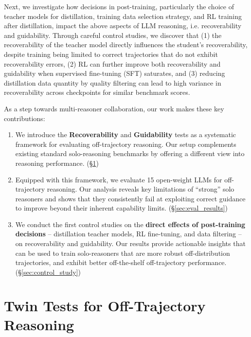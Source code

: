\documentclass{article} %
\begin{document}
Next, we investigate how decisions in post-training, particularly the choice of teacher models for distillation, training data selection strategy, and RL training after distillation, impact the above aspects of LLM reasoning, i.e. recoverability and guidability. Through careful control studies, we discover that (1) the recoverability of the teacher model directly influences the student's recoverability, despite training being limited to correct trajectories that do not exhibit recoverability errors, (2) RL can further improve both recoverability and guidability when supervised fine-tuning (SFT) saturates, and  (3) reducing distillation data quantity by quality filtering can lead to high variance in recoverability across checkpoints for similar benchmark scores.

As a step towards multi-reasoner collaboration, our work makes these key contributions:
\begin{enumerate}
[leftmargin=*, itemsep=0pt, topsep=0pt]
    \item We introduce the \textbf{Recoverability} and \textbf{Guidability} tests as a systematic framework for evaluating off-trajectory reasoning. Our setup complements existing standard solo-reasoning benchmarks by offering a different view into reasoning performance. (\S \ref{sec:twin_test_desc})
    \item Equipped with this framework, we evaluate 15 open-weight LLMs for off-trajectory reasoning. Our analysis reveals key limitations of ``strong'' solo reasoners and shows that they consistently fail at exploiting correct guidance to improve beyond their inherent capability limits.
    (\S \ref{sec:eval_results})
    \item We conduct the first control studies on the \textbf{direct effects of post-training decisions} -- distillation teacher models, RL fine-tuning, and data filtering -- on recoverability and guidability. Our results provide actionable insights that can be used to train solo-reasoners that are more robust off-distribution trajectories, and exhibit better off-the-shelf off-trajectory performance.  (\S \ref{sec:control_study})
\end{enumerate}

\section{Twin Tests for Off-Trajectory Reasoning}
\label{sec:twin_test_desc}
\end{document}
